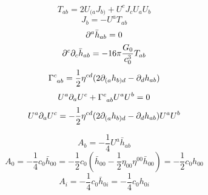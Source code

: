 \begin{equation}
    T_{ab}=2U_{(a}J_{b)}+U^cJ_cU_aU_b
\end{equation}
\begin{equation}
    J_b=-U^aT_{ab}
\end{equation}
\begin{equation}
    \partial^a\bar{h}_{ab}=0
\end{equation}
\begin{equation}
    \partial^c\partial_c\bar{h}_{ab}=-16\pi\frac{G_0}{c_0^3}T_{ab}
\end{equation}
\begin{equation}
    \Gamma^c_{\ph{c}ab}=\frac{1}{2}\eta^{cd}(2\p_{(a}{h}_{b)d}-\p_d{h}_{ab})
\end{equation}
\begin{equation}
    U^a\p_aU^c+\Gamma^c_{\ph{c}ab}U^aU^b=0
\end{equation}
\begin{equation}
    U^a\partial_aU^c=-\frac{1}{2}\eta^{cd}(2\partial_{(a}{h}_{b)d}-\partial_d{h}_{ab})U^aU^b
\end{equation}

\begin{equation}
    A_b
    =-\frac{1}{4}U^a\bar{h}_{ab}
\end{equation}
\begin{equation}
    A_0
    =-\frac{1}{4}c_0\bar{h}_{00}
    =-\frac{1}{2}c_0(\bar{h}_{00}-\frac{1}{2}\eta_{00}\eta^{00}\bar{h}_{00})=-\frac{1}{2}c_0h_{00}
\end{equation}
\begin{equation}
    A_i=-\frac{1}{4}c_0\bar{h}_{0i}=-\frac{1}{4}c_0{h}_{0i}
\end{equation}

